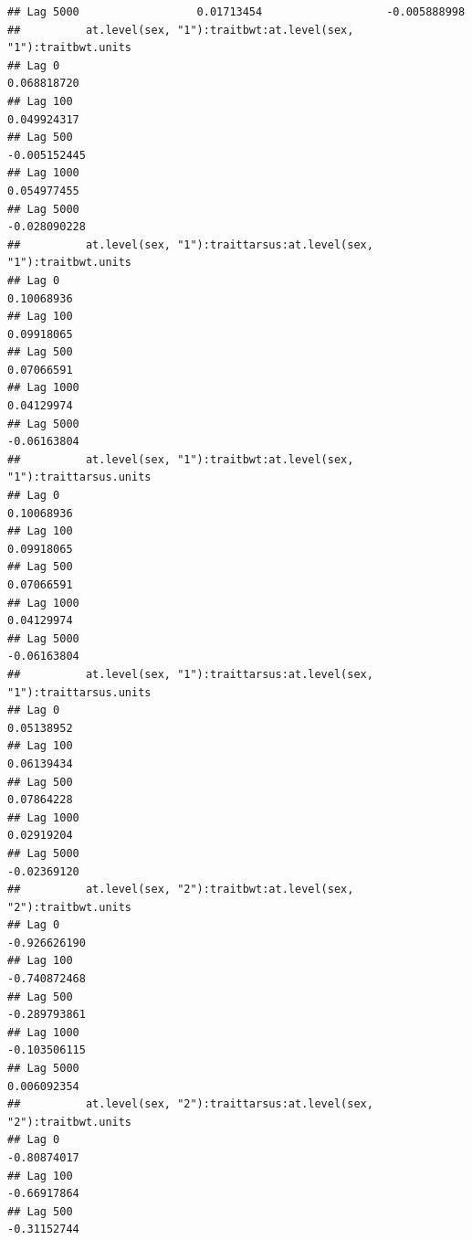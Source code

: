 \documentclass[
  12pt,
]{book}
\begin{document}
\begin{verbatim}
## Lag 5000                  0.01713454                   -0.005888998
##          at.level(sex, "1"):traitbwt:at.level(sex, "1"):traitbwt.units
## Lag 0                                                      0.068818720
## Lag 100                                                    0.049924317
## Lag 500                                                   -0.005152445
## Lag 1000                                                   0.054977455
## Lag 5000                                                  -0.028090228
##          at.level(sex, "1"):traittarsus:at.level(sex, "1"):traitbwt.units
## Lag 0                                                          0.10068936
## Lag 100                                                        0.09918065
## Lag 500                                                        0.07066591
## Lag 1000                                                       0.04129974
## Lag 5000                                                      -0.06163804
##          at.level(sex, "1"):traitbwt:at.level(sex, "1"):traittarsus.units
## Lag 0                                                          0.10068936
## Lag 100                                                        0.09918065
## Lag 500                                                        0.07066591
## Lag 1000                                                       0.04129974
## Lag 5000                                                      -0.06163804
##          at.level(sex, "1"):traittarsus:at.level(sex, "1"):traittarsus.units
## Lag 0                                                             0.05138952
## Lag 100                                                           0.06139434
## Lag 500                                                           0.07864228
## Lag 1000                                                          0.02919204
## Lag 5000                                                         -0.02369120
##          at.level(sex, "2"):traitbwt:at.level(sex, "2"):traitbwt.units
## Lag 0                                                     -0.926626190
## Lag 100                                                   -0.740872468
## Lag 500                                                   -0.289793861
## Lag 1000                                                  -0.103506115
## Lag 5000                                                   0.006092354
##          at.level(sex, "2"):traittarsus:at.level(sex, "2"):traitbwt.units
## Lag 0                                                         -0.80874017
## Lag 100                                                       -0.66917864
## Lag 500                                                       -0.31152744

\end{verbatim}
\end{document}

